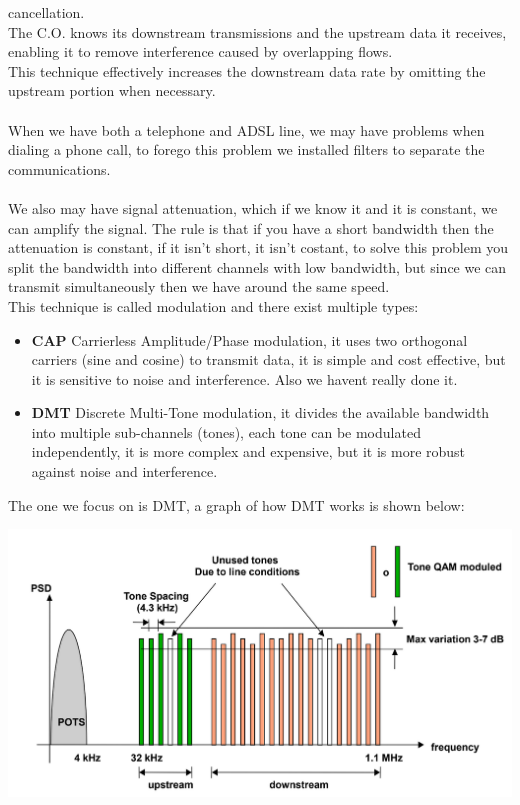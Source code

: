\documentclass[11pt, a4paper]{article}
\begin{document}
cancellation.\\
The C.O. knows its downstream transmissions and the upstream data it receives, enabling
it to remove interference caused by overlapping flows.\\
This technique effectively increases the downstream data rate by omitting the upstream
portion when necessary.\\\\
When we have both a telephone and ADSL line, we may have problems when dialing a phone call, to forego this problem we installed filters to separate the communications.\\\\
We also may have signal attenuation, which if we know it and it is constant, we can amplify the signal. The rule is that if you have a short bandwidth then the attenuation is constant, if it isn't short, it isn't costant, to solve this problem you split the bandwidth into different channels with low bandwidth, but since we can transmit simultaneously then we have around the same speed.\\
This technique is called modulation and there exist multiple types:
\begin{itemize} 
    \item \textbf{CAP} Carrierless Amplitude/Phase modulation, it uses two orthogonal carriers (sine and cosine) to transmit data, it is simple and cost effective, but it is sensitive to noise and interference. Also we havent really done it.
    \item \textbf{DMT} Discrete Multi-Tone modulation, it divides the available bandwidth into multiple sub-channels (tones), each tone can be modulated independently, it is more complex and expensive, but it is more robust against noise and interference.
\end{itemize}
The one we focus on is DMT, a graph of how DMT works is shown below:
\begin{center}
    \includegraphics[scale=0.5]{img/AccessNetworks/XDSL/DMT.png}
\end{center}
\end{document}
